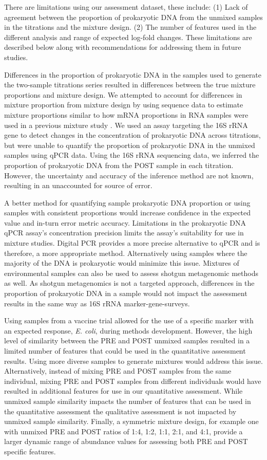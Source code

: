 \documentclass{bmcart}
\begin{document}
There are limitations using our assessment dataset, these include:
(1) Lack of agreement between the proportion of prokaryotic DNA from the
unmixed samples in the titrations and the mixture design.
(2) The number of features used in the
different analysis and range of expected log-fold changes.
These limitations are described below along with
recommendations for addressing them in future studies.

Differences in the proportion of prokaryotic DNA in the samples used to
generate the two-sample titrations series resulted in differences
between the true mixture proportions and mixture design. We attempted to
account for differences in mixture proportion from mixture design by
using sequence data to estimate mixture proportions similar to how mRNA
proportions in RNA samples were used in a previous mixture study
\cite{parsons2015using}. We used an assay targeting the 16S rRNA gene
to detect changes in the concentration of prokaryotic DNA across
titrations, but were unable to quantify the proportion of prokaryotic
DNA in the unmixed samples using qPCR data. Using the 16S rRNA sequencing
data, we inferred the proportion of prokaryotic DNA from the POST sample
in each titration. However, the uncertainty and accuracy of the
inference method are not known, resulting in an unaccounted for source of error.

A better method for quantifying sample prokaryotic DNA proportion or
using samples with consistent proportions would increase confidence in
the expected value and in-turn error metric accuracy. Limitations in the
prokaryotic DNA qPCR assay's concentration precision limits the
assay's suitability for use in mixture studies. Digital PCR provides a
more precise alternative to qPCR and is therefore, a more appropriate
method. Alternatively using samples where the majority of the DNA is
prokaryotic would minimize this issue. Mixtures of environmental samples
can also be used to assess shotgun metagenomic methods as well. As
shotgun metagenomics is not a targeted approach, differences in the
proportion of prokaryotic DNA in a sample would not impact the
assessment results in the same way as 16S rRNA marker-gene-surveys.

Using samples from a vaccine trial allowed for the use of a specific
marker with an expected response, \emph{E. coli}, during methods
development. However, the high level of similarity between the PRE and POST unmixed
samples resulted in a limited number of features that could be used in
the quantitative assessment results. Using more diverse samples to
generate mixtures would address this issue.
Alternatively, instead of mixing PRE and POST samples from the same individual,
mixing PRE and POST samples from different individuals would
have resulted in additional features for use in our quantitative assessment.
While unmixed sample similarity impacts the number of features
that can be used in the quantitative assessment the qualitative
assessment is not impacted by unmixed sample similarity.
Finally, a symmetric mixture design, for example one with unmixed
PRE and POST ratios of 1:4, 1:2, 1:1, 2:1, and 4:1, provide a larger
dynamic range of abundance values for assessing both PRE and POST specific features.
\end{document}
